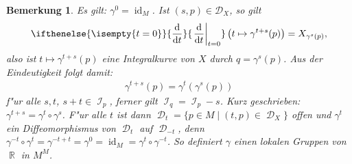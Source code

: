 \documentclass[paper=A4, twoside, chapterprefix=true, bibliography=totoc, headsepline]{scrbook}
\DeclareMathOperator{\R}{\mathbb{R}}
\DeclareMathOperator{\calD}{\mathcal{D}}
\DeclareMathOperator{\calI}{\mathcal{I}}
\DeclareMathOperator{\id}{id}       %
\DeclareMathOperator{\Id}{id}       %
\newcommand{\dop}{\mathrm{d}}
\newcommand{\difffrac}[3][]{\ifthenelse{\isempty{#1}}{\frac{\dop #2}{\dop #3}}{\left. \frac{\dop #2}{\dop #3} \right|_{#1}}}
\theoremstyle{plain}
\theoremstyle{nonumberplain}
\newtheorem{bem}{Bemerkung}
\theoremstyle{empty}
\theoremstyle{break}
\newcommand{\quot}[1]{\textrm{\glqq}{#1}\textrm{\grqq}}
\begin{document}
\begin{bem}
Es gilt: $\gamma^0 = \Id_M$. Ist $(s,p) \in \mathcal D_{X}$, so gilt
\begin{align*}
	\difffrac[t=0]{}{t} \left(t \mapsto \gamma^{t+s}(p) \right) = X_{\gamma^s(p)},
\end{align*}
also ist $t \mapsto \gamma^{t+s}(p)$ eine Integralkurve von $X$ durch $q = \gamma^s(p)$. Aus der Eindeutigkeit folgt damit:
\begin{align*}
	\gamma^{t+s}(p) = \gamma^t(\gamma^s(p))
\end{align*}
f"ur alle $s, t$, $s+t \in \calI_p$, ferner gilt $\calI_q = \calI_p - s$.
Kurz geschrieben: $\gamma^{t+s} = \gamma^t \circ \gamma^s$.
F"ur alle $t$ ist dann $\calD_t = \{ p \in M \mid (t,p) \in \calD_X \}$ offen und $\gamma^t$ ein Diffeomorphismus von $\calD_t$ auf $\calD_{-t}$, denn $\gamma^{-t} \circ \gamma^{t} = \gamma^{-t+t} = \gamma^{0} = \id_M = \gamma^{t} \circ \gamma^{-t}$.
So definiert $\gamma$ einen \quot{lokalen Gruppen} von $\R$ in $M^M$.
\end{bem}


\end{document}
